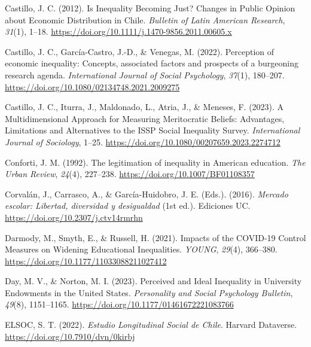 \documentclass[
  12pt,
  a4paper,
]{article}
\newlength{\cslhangindent}
\newenvironment{CSLReferences}[2] %
 {%
  \setlength{\parindent}{0pt}
  \ifodd #1 \everypar{\setlength{\hangindent}{\cslhangindent}}\ignorespaces\fi
  \ifnum #2 > 0
  \setlength{\parskip}{#2\baselineskip}
  \fi
 }%
 {}
\begin{document}
\begin{CSLReferences}{1}{0}
Castillo, J. C. (2012). Is {Inequality Becoming Just}? {Changes} in {Public Opinion} about {Economic Distribution} in {Chile}. \emph{Bulletin of Latin American Research}, \emph{31}(1), 1--18. \url{https://doi.org/10.1111/j.1470-9856.2011.00605.x}

Castillo, J. C., García-Castro, J.-D., \& Venegas, M. (2022). Perception of economic inequality: Concepts, associated factors and prospects of a burgeoning research agenda. \emph{International Journal of Social Psychology}, \emph{37}(1), 180--207. \url{https://doi.org/10.1080/02134748.2021.2009275}

Castillo, J. C., Iturra, J., Maldonado, L., Atria, J., \& Meneses, F. (2023). A {Multidimensional Approach} for {Measuring Meritocratic Beliefs}: {Advantages}, {Limitations} and {Alternatives} to the {ISSP Social Inequality Survey}. \emph{International Journal of Sociology}, 1--25. \url{https://doi.org/10.1080/00207659.2023.2274712}

Conforti, J. M. (1992). The legitimation of inequality in {American} education. \emph{The Urban Review}, \emph{24}(4), 227--238. \url{https://doi.org/10.1007/BF01108357}

Corvalán, J., Carrasco, A., \& García-Huidobro, J. E. (Eds.). (2016). \emph{Mercado escolar: {Libertad}, diversidad y desigualdad} (1st ed.). Ediciones UC. \url{https://doi.org/10.2307/j.ctv14rmrhn}

Darmody, M., Smyth, E., \& Russell, H. (2021). Impacts of the {COVID-19 Control Measures} on {Widening Educational Inequalities}. \emph{YOUNG}, \emph{29}(4), 366--380. \url{https://doi.org/10.1177/11033088211027412}

Day, M. V., \& Norton, M. I. (2023). Perceived and {Ideal Inequality} in {University Endowments} in the {United States}. \emph{Personality and Social Psychology Bulletin}, \emph{49}(8), 1151--1165. \url{https://doi.org/10.1177/01461672221083766}

ELSOC, S. T. (2022). \emph{Estudio {Longitudinal Social} de {Chile}}. Harvard Dataverse. \url{https://doi.org/10.7910/dvn/0kirbj}


\end{CSLReferences}
\end{document}
